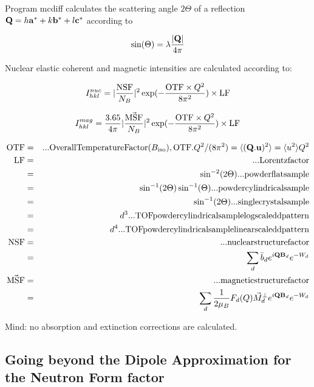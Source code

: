 Program {\prg mcdiff} calculates the 
scattering angle $2\Theta$ of a reflection 
$\mathbf Q=h\mathbf a^*+k \mathbf b^*+l \mathbf c^*$
according to 

\begin{equation}
\sin(\Theta)=\lambda \frac{|\mathbf Q|}{4\pi}
\end{equation}

Nuclear elastic coherent and magnetic intensities are calculated
according to:

\begin{equation}
I^{nuc}_{hkl}=|\frac{\rm NSF}{N_B}|^2 \exp(-\frac{{\rm OTF}\times Q^2}{8\pi^2}) \times {\rm LF} 
\end{equation}

\begin{equation}
I^{mag}_{hkl}=\frac{3.65}{4\pi}|\frac{\vec{\rm  MSF}}{N_B}|^2  \exp(-\frac{{\rm OTF}\times Q^2}{8\pi^2}) \times {\rm %
LF} 
\end{equation}

\begin{eqnarray}
{\rm OTF}&=& {\rm ... Overall Temperature Factor (}B_{\rm iso}),{\rm  OTF}.Q^2/(8\pi^2) =\langle (\mbf Q.\mbf %
u)^2 \rangle = \langle u^2 \rangle Q^2  \\
{\rm LF} &=& {\rm ... Lorentzfactor}  \\
              & =& \sin^{-2}(2\Theta){\rm ... powder flat sample}\\
              & =& \sin^{-1}(2\Theta)\sin^{-1}(\Theta){\rm ... powder cylindrical sample}\\
              & =& \sin^{-1}(2\Theta){\rm ...single crystal sample}\\
             & =& d^3 {\rm ... TOF powder cylindrical sample log scaled d pattern}\\
             & =& d^4 {\rm... TOF powder cylindrical sample linear scaled d pattern}\\
{\rm NSF} &=&{\rm ... nuclear structure factor}\\
                 &=&  \sum_{d} \bar b_d e^{i\mbf Q \mbf B_d} e^{-W_d}\\
\vec{\rm MSF} &=&{\rm ... magnetic structure factor}\\
                &=& \sum_{d}\frac{1}{2\mu_B}F_d(Q) \vec M^{\perp}_{d} e^{i\mbf Q\mbf B_d} e^{-W_d} 
\end{eqnarray}

Mind: no absorption and extinction corrections are calculated.


\subsection{Going beyond the Dipole Approximation for the Neutron Form factor}\label{mcdiff_gobeyond}

